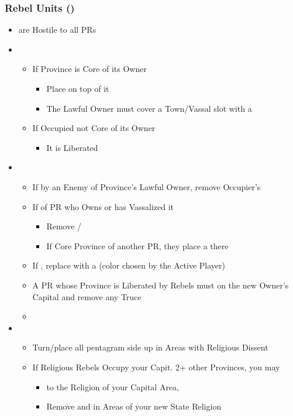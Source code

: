 \documentclass[10pt]{article}
\begin{document}
\subsubsection*{Rebel Units (\rebel)}
\begin{itemize}
	\item \rebels are Hostile to all PRs
	\item {}
	\begin{itemize}
		\item If Province is Core of its Owner
		\begin{itemize}
			\item Place \rebeltown on top of it
			\item The Lawful Owner must cover a Town/Vassal slot with a \cube
		\end{itemize}
		\item If Occupied  not Core of its Owner
		\begin{itemize}
			\item It is Liberated
		\end{itemize}
	\end{itemize}
	\item {}
	\begin{itemize}
		\item If  by an Enemy of Province's Lawful Owner, remove Occupier's \town
		\item If  of PR who Owns or has Vassalized it
		\begin{itemize}
			\item Remove \town/\vassal
			\item If Core Province of another PR, they place a \town there
		\end{itemize}
		\item If , replace \town with a \dnpr (color chosen by the Active Player)
		\item A PR whose Province is Liberated by Rebels must  on the new Owner's Capital and remove any Truce
		\item {}
	\end{itemize}
	\item {}
	\begin{itemize}
		\item Turn/place all \rebeltowns pentagram side up in Areas with Religious Dissent
		\item If Religious Rebels Occupy your Capit.  2+ other Provinces, you may
		\begin{itemize}
			\item {} to the Religion of your Capital Area, 
			\item Remove \rebels and \rebeltowns in Areas of your new State Religion
		\end{itemize}
	\end{itemize}
\end{itemize}
\end{document}
